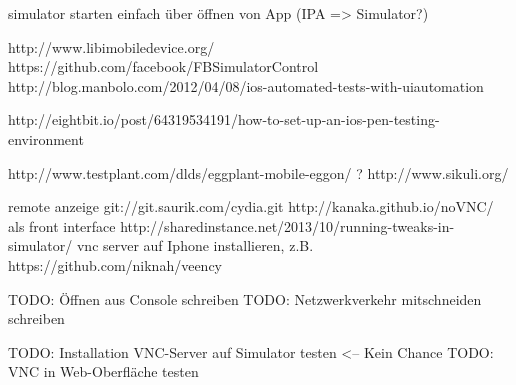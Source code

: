 simulator starten einfach über öffnen von App (IPA => Simulator?)

http://www.libimobiledevice.org/
https://github.com/facebook/FBSimulatorControl
http://blog.manbolo.com/2012/04/08/ios-automated-tests-with-uiautomation

http://eightbit.io/post/64319534191/how-to-set-up-an-ios-pen-testing-environment

http://www.testplant.com/dlds/eggplant-mobile-eggon/ ?
http://www.sikuli.org/

remote anzeige
git://git.saurik.com/cydia.git
http://kanaka.github.io/noVNC/ als front interface
http://sharedinstance.net/2013/10/running-tweaks-in-simulator/ vnc server auf Iphone installieren, z.B. https://github.com/niknah/veency

TODO: Öffnen aus Console schreiben
TODO: Netzwerkverkehr mitschneiden schreiben


TODO: Installation VNC-Server auf Simulator testen <-- Kein Chance
TODO: VNC in Web-Oberfläche testen
